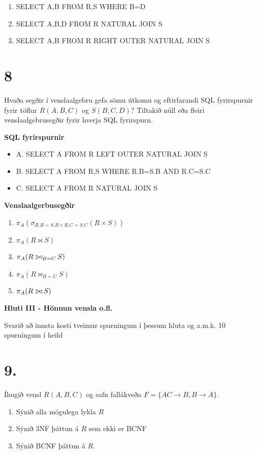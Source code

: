 \documentclass{article}
\def\ojoin{\setbox0=\hbox{$\bowtie$}%
  \rule[-.02ex]{.25em}{.4pt}\llap{\rule[\ht0]{.25em}{.4pt}}}
\def\leftouterjoin{\mathbin{\ojoin\mkern-5.8mu\bowtie}}
\newcommand{\bo}[1]{\textbf{#1}}
\newcommand{\enum}{\begin{enumerate}[label = \alph*.]}
\begin{document}
\enum
\item SELECT A,B FROM R,S WHERE B=D
\item SELECT A,B,D FROM R NATURAL JOIN S
\item SELECT A,B FROM R RIGHT OUTER NATURAL JOIN S
\end{enumerate}

\vspace{1cm}

\section{8}
Hvaða segðir í venslaalgebru gefa sömu útkomu og eftirfarandi
SQL fyrirspurnir fyrir töflur $R(A, B, C)$ og $S(B, C, D)$? Tiltakið núll eða
fleiri venslaalgebrusegðir fyrir hverja SQL fyrirspurn.

\bo{SQL fyrirspurnir}
\begin{itemize}
    \item A. SELECT A FROM R LEFT OUTER NATURAL JOIN S
    \item B. SELECT A FROM R,S WHERE R.B=S.B AND R.C=S.C
    \item C. SELECT A FROM R NATURAL JOIN S
\end{itemize}
\bo{Venslaalgerbusegðir}
\enum
\item $\pi_A(\sigma_{R.B=S.B\wedge R.C=S.C}(R\times S))$
\item $\pi_A(R \bowtie S)$
\item $\pi_A(R \leftouterjoin_{B=C}S)$
\item $\pi_A(R \bowtie_{B=C}S)$
\item $\pi_A(R \leftouterjoin S)$
\end{enumerate}

\newpage

\begin{center}
    \bo{Hluti III - Hönnun vensla o.fl.}

    Svarið að innsta kosti tveimur spurningum í þessum 
    hluta og a.m.k. 10 spurningum í heild

\end{center}

\section{9.}
Íhugið vensl $R(A, B, C)$ og safn fallákveða $F = \{AC \rightarrow B, B \rightarrow A\}$.

\enum
\item Sýnið alla mögulega lykla $R$
\item Sýnið 3NF þáttun á $R$ sem ekki er BCNF
\item Sýnið BCNF þáttun á $R$.
\end{enumerate}
\end{document}
